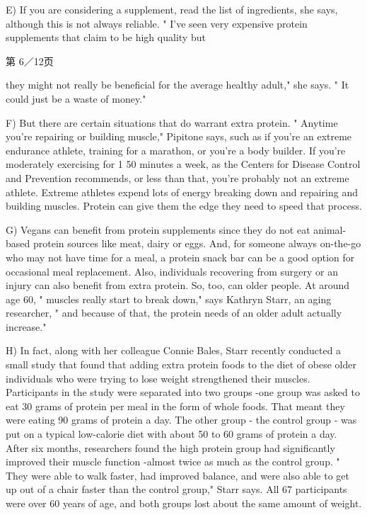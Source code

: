 \documentclass[UTF8,11pt]{ctexart}
\begin{document}
E) If you are considering a supplement, read the list of ingredients, she says, although this is not always reliable. " I've seen very expensive protein supplements that claim to be high quality but


第 6／12页


they might not really be beneficial for the average healthy adult," she says. " It could just be a waste of money."


F) But there are certain situations that do warrant extra protein. " Anytime you're repairing or building muscle," Pipitone says, such as if you're an extreme endurance athlete, training for a marathon, or you're a body builder. If you're moderately exercising for 1 50 minutes a week, as the Centers for Disease Control and Prevention recommends, or less than that, you're probably not an extreme athlete. Extreme athletes expend lots of energy breaking down and repairing and building muscles. Protein can give them the edge they need to speed that process.


G) Vegans can benefit from protein supplements since they do not eat animal-based protein sources like meat, dairy or eggs. And, for someone always on-the-go who may not have time for a meal, a protein snack bar can be a good option for occasional meal replacement. Also, individuals recovering from surgery or an injury can also benefit from extra protein. So, too, can older people. At around age 60, " muscles really start to break down," says Kathryn Starr, an aging researcher, " and because of that, the protein needs of an older adult actually increase."


H) In fact, along with her colleague Connie Bales, Starr recently conducted a small study that found that adding extra protein foods to the diet of obese older individuals who were trying to lose weight strengthened their muscles. Participants in the study were separated into two groups -one group was asked to eat 30 grams of protein per meal in the form of whole foods. That meant they were eating 90 grams of protein a day. The other group - the control group - was put on a typical low-calorie diet with about 50 to 60 grams of protein a day. After six months, researchers found the high protein group had significantly improved their muscle function -almost twice as much as the control group. " They were able to walk faster, had improved balance, and were also able to get up out of a chair faster than the control group," Starr says. All 67 participants were over 60 years of age, and both groups lost about the same amount of weight.
\end{document}

